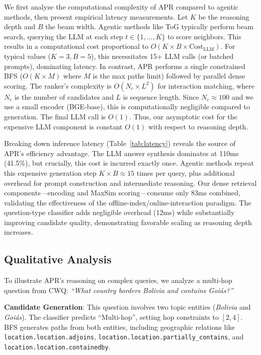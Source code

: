 \documentclass[conference]{IEEEtran}
\newcommand{\model}{\textsc{APR}}
\begin{document}
We first analyze the computational complexity of \model{} compared to agentic methods, then present empirical latency measurements. Let $K$ be the reasoning depth and $B$ the beam width. Agentic methods like ToG typically perform beam search, querying the LLM at each step $t \in \{1,\dots,K\}$ to score neighbors. This results in a computational cost proportional to $O(K \times B \times \text{Cost}_{\text{LLM}})$. For typical values ($K=3, B=5$), this necessitates 15+ LLM calls (or batched prompts), dominating latency. In contrast, \model{} performs a single constrained BFS ($O(K \times M)$ where $M$ is the max paths limit) followed by parallel dense scoring. The ranker's complexity is $O(N_c \times L^2)$ for interaction matching, where $N_c$ is the number of candidates and $L$ is sequence length. Since $N_c \approx 100$ and we use a small encoder (BGE-base), this is computationally negligible compared to generation. The final LLM call is $O(1)$. Thus, our asymptotic cost for the expensive LLM component is constant $O(1)$ with respect to reasoning depth.

Breaking down inference latency (Table~\ref{tab:latency}) reveals the source of \model{}'s efficiency advantage. The LLM answer synthesis dominates at 110ms (41.5\%), but crucially, this cost is incurred exactly once. Agentic methods repeat this expensive generation step $K \times B \approx 15$ times per query, plus additional overhead for prompt construction and intermediate reasoning. Our dense retrieval components---encoding and MaxSim scoring---consume only 83ms combined, validating the effectiveness of the offline-index/online-interaction paradigm. The question-type classifier adds negligible overhead (12ms) while substantially improving candidate quality, demonstrating favorable scaling as reasoning depth increases.

\subsection{Qualitative Analysis}
To illustrate \model{}'s reasoning on complex queries, we analyze a multi-hop question from CWQ: \textit{“What country borders Bolivia and contains Goiás?”}

\textbf{Candidate Generation}: This question involves two topic entities (\textit{Bolivia} and \textit{Goiás}). The classifier predicts “Multi-hop”, setting hop constraints to $[2, 4]$. BFS generates paths from both entities, including geographic relations like \texttt{location.location.adjoins}, \texttt{location.location.partially\_contains}, and \texttt{location.location.containedby}.
\end{document}
